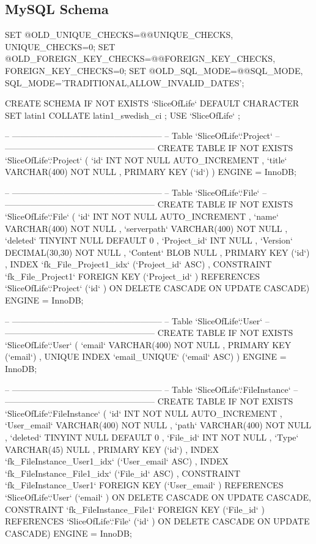 \subsection{MySQL Schema}
\label{sql}
\begin{spverbatim}
SET @OLD_UNIQUE_CHECKS=@@UNIQUE_CHECKS, UNIQUE_CHECKS=0;
SET @OLD_FOREIGN_KEY_CHECKS=@@FOREIGN_KEY_CHECKS, FOREIGN_KEY_CHECKS=0;
SET @OLD_SQL_MODE=@@SQL_MODE, SQL_MODE='TRADITIONAL,ALLOW_INVALID_DATES';

CREATE SCHEMA IF NOT EXISTS `SliceOfLife` DEFAULT CHARACTER SET latin1 COLLATE latin1_swedish_ci ;
USE `SliceOfLife` ;

-- -----------------------------------------------------
-- Table `SliceOfLife`.`Project`
-- -----------------------------------------------------
CREATE  TABLE IF NOT EXISTS `SliceOfLife`.`Project` (
  `id` INT NOT NULL AUTO_INCREMENT ,
  `title` VARCHAR(400) NOT NULL ,
  PRIMARY KEY (`id`) )
ENGINE = InnoDB;


-- -----------------------------------------------------
-- Table `SliceOfLife`.`File`
-- -----------------------------------------------------
CREATE  TABLE IF NOT EXISTS `SliceOfLife`.`File` (
  `id` INT NOT NULL AUTO_INCREMENT ,
  `name` VARCHAR(400) NOT NULL ,
  `serverpath` VARCHAR(400) NOT NULL ,
  `deleted` TINYINT NULL DEFAULT 0 ,
  `Project_id` INT NULL ,
  `Version` DECIMAL(30,30) NOT NULL ,
  `Content` BLOB NULL ,
  PRIMARY KEY (`id`) ,
  INDEX `fk_File_Project1_idx` (`Project_id` ASC) ,
  CONSTRAINT `fk_File_Project1`
    FOREIGN KEY (`Project_id` )
    REFERENCES `SliceOfLife`.`Project` (`id` )
    ON DELETE CASCADE
    ON UPDATE CASCADE)
ENGINE = InnoDB;


-- -----------------------------------------------------
-- Table `SliceOfLife`.`User`
-- -----------------------------------------------------
CREATE  TABLE IF NOT EXISTS `SliceOfLife`.`User` (
  `email` VARCHAR(400) NOT NULL ,
  PRIMARY KEY (`email`) ,
  UNIQUE INDEX `email_UNIQUE` (`email` ASC) )
ENGINE = InnoDB;


-- -----------------------------------------------------
-- Table `SliceOfLife`.`FileInstance`
-- -----------------------------------------------------
CREATE  TABLE IF NOT EXISTS `SliceOfLife`.`FileInstance` (
  `id` INT NOT NULL AUTO_INCREMENT ,
  `User_email` VARCHAR(400) NOT NULL ,
  `path` VARCHAR(400) NOT NULL ,
  `deleted` TINYINT NULL DEFAULT 0 ,
  `File_id` INT NOT NULL ,
  `Type` VARCHAR(45) NULL ,
  PRIMARY KEY (`id`) ,
  INDEX `fk_FileInstance_User1_idx` (`User_email` ASC) ,
  INDEX `fk_FileInstance_File1_idx` (`File_id` ASC) ,
  CONSTRAINT `fk_FileInstance_User1`
    FOREIGN KEY (`User_email` )
    REFERENCES `SliceOfLife`.`User` (`email` )
    ON DELETE CASCADE
    ON UPDATE CASCADE,
  CONSTRAINT `fk_FileInstance_File1`
    FOREIGN KEY (`File_id` )
    REFERENCES `SliceOfLife`.`File` (`id` )
    ON DELETE CASCADE
    ON UPDATE CASCADE)
ENGINE = InnoDB;



\end{spverbatim}
